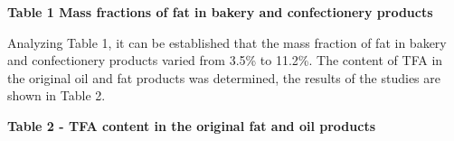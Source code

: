 {\bfseries Table 1 Mass fractions of fat in bakery and confectionery products}


Analyzing Table 1, it can be established that the mass fraction of fat
in bakery and confectionery products varied from 3.5\% to 11.2\%. The
content of TFA in the original oil and fat products was determined, the
results of the studies are shown in Table 2.

{\bfseries Table 2 - TFA content in the original fat and oil products}

